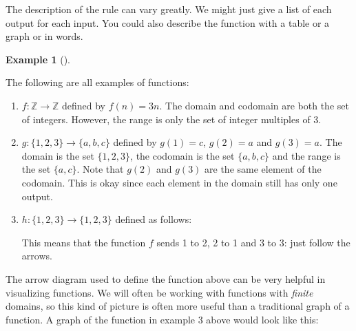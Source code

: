 \documentclass[10pt,]{book}
\theoremstyle{plain}
\theoremstyle{definition}
\newtheorem{example}[theorem]{Example}
\theoremstyle{definition}
\theoremstyle{definition}
\def\Z{\mathbb Z}
\begin{document}
      The description of the rule can vary greatly. We might just give a list of each output for each input. You could also describe the function with a table or a graph or in words.
\begin{example}[]\label{example-16}

          The following are all examples of functions:
\leavevmode%
\begin{enumerate}
\item\hypertarget{li-276}{}\(f:\Z \to \Z\) defined by \(f(n) = 3n\). The domain and codomain are both the set of integers. However, the range is only the set of integer multiples of 3.\item\hypertarget{li-277}{}\(g: \{1,2,3\} \to \{a,b,c\}\) defined by \(g(1) = c\), \(g(2) = a\) and \(g(3) = a\). The domain is the set \(\{1,2,3\}\), the codomain is the set \(\{a,b,c\}\) and the range is the set \(\{a,c\}\). Note that \(g(2)\) and \(g(3)\) are the same element of the codomain. This is okay since each element in the domain still has only one output.\item\hypertarget{li-278}{}\(h:\{1,2,3\} \to \{1,2,3\}\) defined as follows:

            \leavevmode%
\begin{figure}
\centering
{
}
\end{figure}

            This means that the function \(f\) sends 1 to 2, 2 to 1 and 3 to 3: just follow the arrows.
          \end{enumerate}
\end{example}
\par

      The arrow diagram used to define the function above can be very helpful in visualizing functions. We will often be working with functions with \emph{finite} domains, so this kind of picture is often more useful than a traditional graph of a function. A graph of the function in example 3 above would look like this:
\leavevmode%
\begin{figure}
\centering
{
}
\end{figure}
\par
\end{document}
